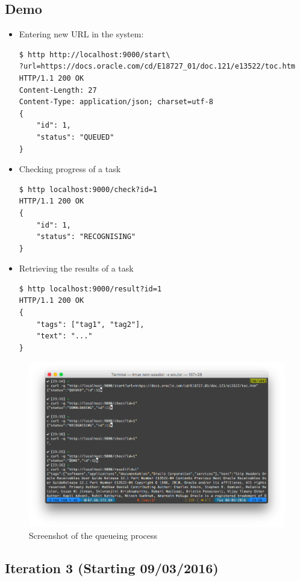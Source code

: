 \documentclass[a4paper,12pt]{article}
\begin{document}
\subsection*{Demo}
\begin{itemize}
\item Entering new URL in the system:
\begin{lstlisting}
$ http http://localhost:9000/start\ 
?url=https://docs.oracle.com/cd/E18727_01/doc.121/e13522/toc.htm
HTTP/1.1 200 OK
Content-Length: 27
Content-Type: application/json; charset=utf-8
{
    "id": 1,
    "status": "QUEUED"
}
\end{lstlisting}
\item Checking progress of a task
\begin{lstlisting}
$ http localhost:9000/check?id=1
HTTP/1.1 200 OK
{
    "id": 1,
    "status": "RECOGNISING"
}
\end{lstlisting}
\item Retrieving the results of a task
\begin{lstlisting}
$ http localhost:9000/result?id=1
HTTP/1.1 200 OK
{
    "tags": ["tag1", "tag2"],
    "text": "..."
}
\end{lstlisting}
\end{itemize}
\begin{figure}[H]
  \centering
      \includegraphics[width=\textwidth]{figures/screenshot-queueing}
  \caption{Screenshot of the queueing process}
\label{fig:screenshot-queueing}
\end{figure}
\subsection*{Iteration 3 (Starting 09/03/2016)}
\end{document}
